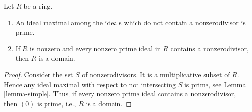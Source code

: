\begin{lemma}
\label{lemma-characterize-domain}
Let $R$ be a ring.
\begin{enumerate}
\item An ideal maximal among the ideals which do not contain a
nonzerodivisor is prime.
\item If $R$ is nonzero and every nonzero prime ideal in $R$
contains a nonzerodivisor, then $R$ is a domain.
\end{enumerate}
\end{lemma}

\begin{proof}
Consider the set $S$ of nonzerodivisors. It is a multiplicative
subset of $R$. Hence any ideal maximal with respect to not intersecting
$S$ is prime, see
Lemma \ref{lemma-simple}.
Thus, if every nonzero prime ideal contains a nonzerodivisor, then
$(0)$ is prime, i.e., $R$ is a domain.
\end{proof}